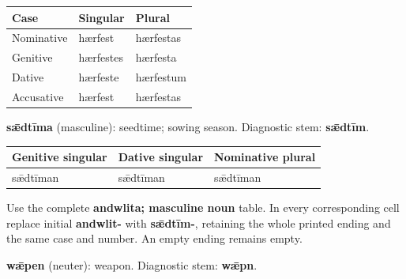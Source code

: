 \par\begingroup
\fontsize{10.5}{13.2}\selectfont
\setlength{\LTleft}{0pt}\setlength{\LTright}{\fill}
\noindent
\begin{tabular}{@{}>{\raggedright\arraybackslash}p{39.46mm}>{\raggedright\arraybackslash}p{39.46mm}>{\raggedright\arraybackslash}p{39.46mm}@{}}
\toprule
\textbf{Case} & \textbf{Singular} & \textbf{Plural} \\
\midrule
Nominative & hærfest & hærfestas \\
Genitive & hærfestes & hærfesta \\
Dative & hærfeste & hærfestum \\
Accusative & hærfest & hærfestas \\
\bottomrule
\end{tabular}
\par\endgroup

\textbf{sǣdtīma} (masculine): seedtime; sowing season. Diagnostic stem: \textbf{sǣdtīm}.

\par\begingroup
\fontsize{10.5}{13.2}\selectfont
\setlength{\LTleft}{0pt}\setlength{\LTright}{\fill}
\noindent
\begin{tabular}{@{}>{\raggedright\arraybackslash}p{39.24mm}>{\raggedright\arraybackslash}p{36.31mm}>{\raggedright\arraybackslash}p{42.82mm}@{}}
\toprule
\textbf{Genitive singular} & \textbf{Dative singular} & \textbf{Nominative plural} \\
\midrule
sǣdtīman & sǣdtīman & sǣdtīman \\
\bottomrule
\end{tabular}
\par\endgroup

Use the complete \textbf{andwlita; masculine noun} table. In every corresponding cell replace initial \textbf{andwlit-} with \textbf{sǣdtīm-}, retaining the whole printed ending and the same case and number. An empty ending remains empty.

\textbf{wǣpen} (neuter): weapon. Diagnostic stem: \textbf{wǣpn}.

